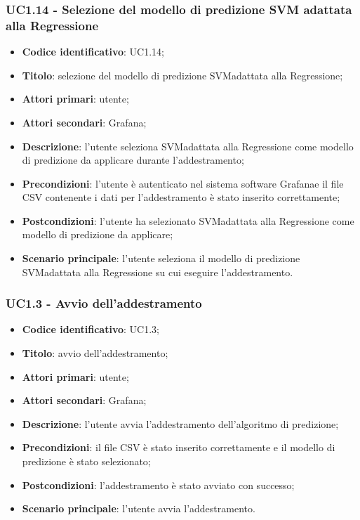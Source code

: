\subsubsection{UC1.14 - Selezione del modello di predizione SVM adattata alla Regressione}
\begin{itemize}
	\item \textbf{Codice identificativo}: UC1.14;
	\item \textbf{Titolo}: selezione del modello di predizione SVM\glosp adattata alla Regressione;
	\item \textbf{Attori primari}: utente;
	\item \textbf{Attori secondari}: Grafana\glo;
	\item \textbf{Descrizione}: l'utente seleziona SVM\glosp adattata alla Regressione come modello di predizione da applicare durante l'addestramento;
	\item \textbf{Precondizioni}: l'utente è autenticato nel sistema software Grafana\glosp e il file CSV contenente i dati per l'addestramento è stato inserito correttamente;
	\item \textbf{Postcondizioni}: l'utente ha selezionato SVM\glosp adattata alla Regressione come modello di predizione da applicare;
	\item \textbf{Scenario principale}: l'utente seleziona il modello di predizione SVM\glosp adattata alla Regressione su cui eseguire l'addestramento.
\end{itemize}
\subsubsection{UC1.3 - Avvio dell'addestramento}
\begin{itemize}
	\item \textbf{Codice identificativo}: UC1.3;
	\item \textbf{Titolo}: avvio dell'addestramento;
	\item \textbf{Attori primari}: utente;
	\item \textbf{Attori secondari}: Grafana\glo;
	\item \textbf{Descrizione}: l'utente avvia l'addestramento dell'algoritmo di predizione;
	\item \textbf{Precondizioni}: il file CSV è stato inserito correttamente e il modello di predizione è stato selezionato;
	\item \textbf{Postcondizioni}: l'addestramento è stato avviato con successo;
	\item \textbf{Scenario principale}: l'utente avvia l'addestramento.
\end{itemize}

